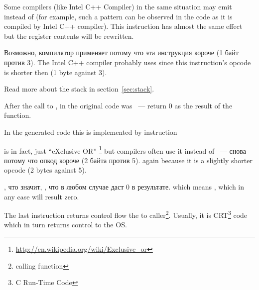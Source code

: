 {Some compilers (like Intel C++ Compiler) in the same situation may emit  
instead of \ADD (for example, such a pattern can be observed in the \oracle{} code as it is compiled by Intel C++ compiler).
This instruction has almost the same effect but the \ECX register contents will be rewritten.}

\IFRU
{Возможно, компилятор применяет  потому что эта инструкция короче (1 байт против 3).}
{The Intel C++ compiler probably uses  since this instruction's opcode is shorter then 
 (1 byte against 3).}

{Read more about the stack in section}~\ref{sec:stack}.

{After the call to \printf, in the original \CCpp code was  ~--- 
return $0$ as the result of the \main function.}

{In the generated code this is implemented by instruction}  

{\XOR is in fact, just ``eXclusive OR''}
\footnote{\url{http://en.wikipedia.org/wiki/Exclusive_or}}
{but compilers often use it instead of}
 ~--- 
\IFRU
{снова потому что опкод короче (2 байта против 5).}
{again because it is a slightly shorter opcode (2 bytes against 5).}

, 
\IFRU
{что значит, , что в любом случае даст 0 в результате.}
{which means , which in any case will result zero.}

{The last instruction \RET returns control flow the to caller\footnote{calling function}.
Usually, it is \CCpp CRT\footnote{C Run-Time Code} code which in turn
returns control to the \ac{OS}.}

